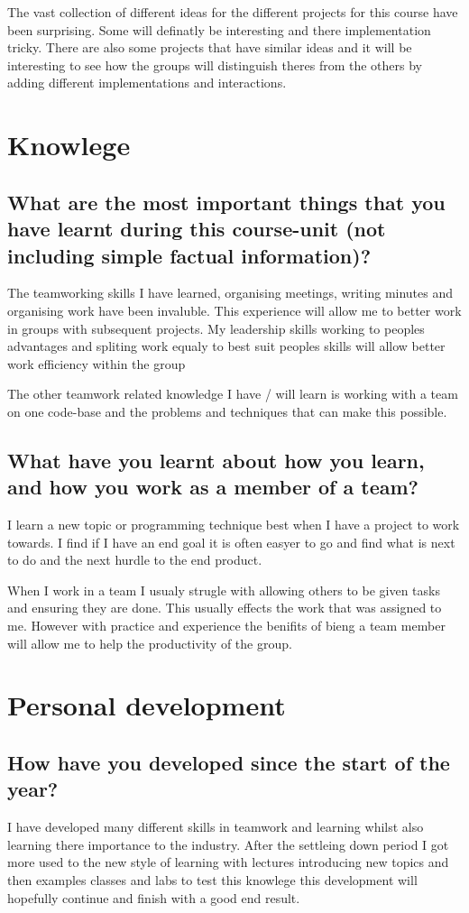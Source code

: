 \documentclass[12pt]{article}
\begin{document}
      The vast collection of different ideas for the different projects for this
      course have been surprising. Some will definatly be interesting and there
      implementation tricky. There are also some projects that have similar 
      ideas and it will be interesting to see how the groups will distinguish
      theres from the others by adding different implementations and 
      interactions.
  \section{Knowlege}
    \subsection{What are the most important things that you have learnt during
      this course-unit (not including simple factual information)?}
      The teamworking skills I have learned, organising meetings, writing
      minutes and organising work have been invaluble. This experience will
      allow me to better work in groups with subsequent projects. My leadership
      skills working to peoples advantages and spliting work equaly to best suit
      peoples skills will allow better work efficiency within the group

      The other teamwork related knowledge I have / will learn is working with
      a team on one code-base and the problems and techniques that can make this
      possible.
    \subsection{What have you learnt about how you learn, and how you work as
      a member of a team?}
      I learn a new topic or programming technique best when I have a project to
      work towards. I find if I have an end goal it is often easyer to go and
      find what is next to do and the next hurdle to the end product.

      When I work in a team I usualy strugle with allowing others to be given
      tasks and ensuring they are done. This usually effects the work that was
      assigned to me. However with practice and experience the benifits of 
      bieng a team member will allow me to help the productivity of the group.
  \section{Personal development}
    \subsection{How have you developed since the start of the year?}
      I have developed many different skills in teamwork and learning whilst
      also learning there importance to the industry. After the settleing down
      period I got more used to the new style of learning with lectures
      introducing new topics and then examples classes and labs to test this
      knowlege this development will hopefully continue and finish with a good
      end result.
\end{document}
